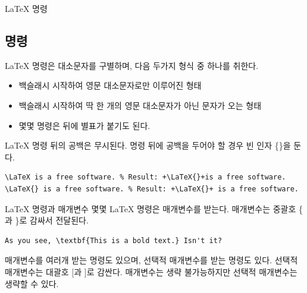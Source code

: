 \documentclass{beamer}
\begin{document}
\begin{frame}[fragile]{\LaTeX{} 명령}
    \subsection{명령}

    \LaTeX{} 명령은 대소문자를 구별하며, 다음 두가지 형식 중 하나를 취한다.
    \begin{itemize}
        \item 백슬래시  시작하여 영문 대소문자로만 이루어진 형태
        \item 백슬래시  시작하여 딱 한 개의 영문 대소문자가 아닌 문자가 오는 형태
        \item 몇몇 명령은 뒤에 별표가 붙기도 된다.
    \end{itemize}

    \LaTeX{} 명령 뒤의 공백은 무시된다. 명령 뒤에 공백을 두어야 할 경우 빈 인자 \{\}을 둔다.
    \begin{lstlisting}[escapeinside=++, showspaces=true]
\LaTeX is a free software. % Result: +\LaTeX{}+is a free software.
\LaTeX{} is a free software. % Result: +\LaTeX{}+ is a free software.
\end{lstlisting}
\end{frame}

\begin{frame}[fragile]{\LaTeX{} 명령과 매개변수}
    몇몇 \LaTeX{} 명령은 매개변수를 받는다. 매개변수는 중괄호 \{ 과 \}로 감싸서 전달된다.
    \begin{lstlisting}[numbers=none]
As you see, \textbf{This is a bold text.} Isn't it?
    \end{lstlisting}

    매개변수를 여러개 받는 명령도 있으며, 선택적 매개변수를 받는 명령도 있다. 선택적 매개변수는 대괄호 [과 ]로 감싼다. 매개변수는 생략 불가능하지만 선택적 매개변수는 생략할 수 있다.
\end{frame}
\end{document}
